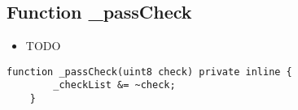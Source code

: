 \subsection{Function \_{}passCheck}

\begin{itemize}
\item TODO
\end{itemize}

\begin{lstlisting}[firstnumber=58]
    function _passCheck(uint8 check) private inline {
        _checkList &= ~check;
    }
\end{lstlisting}
